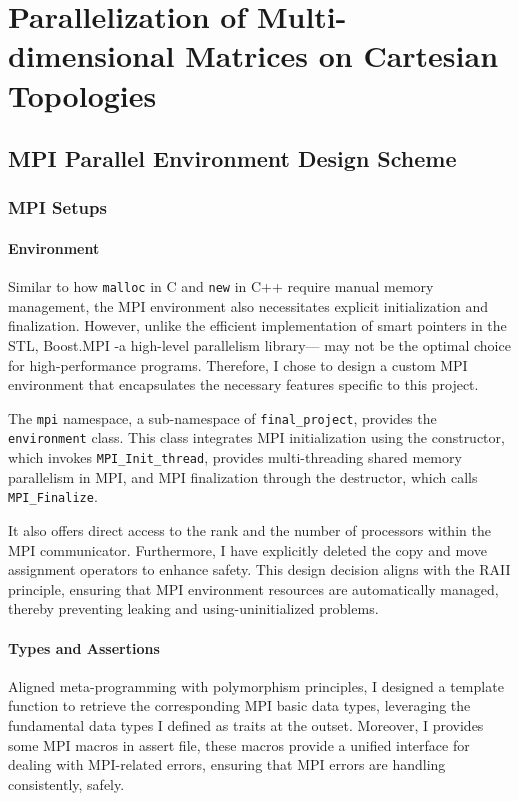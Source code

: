 \section{Parallelization of Multi-dimensional Matrices on Cartesian Topologies}


\subsection{MPI Parallel Environment Design Scheme}\label{SEC:SUB:MPI_Topology}
\subsubsection{MPI Setups}
\paragraph{Environment}
Similar to how \texttt{malloc} in C and \texttt{new} in C++ require manual memory management, 
the MPI environment also necessitates explicit initialization and finalization. 
However, unlike the efficient implementation of smart pointers in the STL, 
Boost.MPI\cite{BOOST_MPI}
-a high-level parallelism library—
may not be the optimal choice for high-performance programs. 
Therefore, I chose to design a custom MPI environment that encapsulates the necessary features specific to this project.

The \texttt{mpi} namespace, a sub-namespace of \texttt{final\_project}, provides the \texttt{environment} class. 
This class integrates MPI initialization using the constructor, which invokes \texttt{MPI\_Init\_thread},
provides multi-threading shared memory parallelism in MPI, 
and MPI finalization through the destructor, which calls \texttt{MPI\_Finalize}.

It also offers direct access to the rank and the number of processors within the MPI communicator.
Furthermore, I have explicitly deleted the copy and move assignment operators to enhance safety. 
This design decision aligns with the RAII principle, 
ensuring that MPI environment resources are automatically managed, thereby preventing leaking and 
using-uninitialized problems.

\paragraph{Types and Assertions} 
Aligned meta-programming with polymorphism principles, 
I designed a template function to retrieve the corresponding MPI basic data types, 
leveraging the fundamental data types I defined as traits at the outset.
Moreover, I provides some MPI macros in assert file, 
these macros provide a unified interface for dealing with MPI-related errors,
ensuring that MPI errors are handling consistently, safely. 

